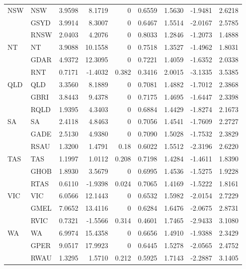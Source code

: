 \begin{table}[htbp]
{\begin{tabular}{llrrrrrrr}
    \multirow{3}[0]{*}{NSW} & NSW   & 3.9598 & 8.1719 & 0     & 0.6559 & 1.5630 & -1.9481 & 2.6218 \\
          & GSYD  & 3.9914 & 8.3007 & 0     & 0.6467 & 1.5514 & -2.0167 & 2.5785 \\
          & RNSW  & 2.0403 & 4.2076 & 0     & 0.8033 & 1.2846 & -1.2073 & 1.4888 \\
    \multirow{3}[0]{*}{NT} & NT    & 3.9088 & 10.1558 & 0     & 0.7518 & 1.3527 & -1.4962 & 1.8031 \\
          & GDAR  & 4.9372 & 12.3095 & 0     & 0.7221 & 1.4059 & -1.6352 & 2.0338 \\
          & RNT   & 0.7171 & -1.4032 & 0.382 & 0.3416 & 2.0015 & -3.1335 & 3.5385 \\
    \multirow{3}[0]{*}{QLD} & QLD   & 3.3560 & 8.1889 & 0     & 0.7081 & 1.4882 & -1.7012 & 2.3868 \\
          & GBRI  & 3.8443 & 9.4378 & 0     & 0.7175 & 1.4695 & -1.6447 & 2.3398 \\
          & RQLD  & 1.9395 & 4.3403 & 0     & 0.6884 & 1.4429 & -1.8274 & 2.1673 \\
    \multirow{3}[0]{*}{SA} & SA    & 2.4118 & 4.8463 & 0     & 0.7056 & 1.4541 & -1.7609 & 2.2727 \\
          & GADE  & 2.5130 & 4.9380 & 0     & 0.7090 & 1.5028 & -1.7532 & 2.3829 \\
          & RSAU  & 1.3200 & 1.4791 & 0.18  & 0.6022 & 1.5512 & -2.3196 & 2.6220 \\
    \multirow{3}[0]{*}{TAS} & TAS   & 1.1997 & 1.0112 & 0.208 & 0.7198 & 1.4284 & -1.4611 & 1.8390 \\
          & GHOB  & 1.8930 & 3.5679 & 0     & 0.6995 & 1.4536 & -1.5275 & 1.9228 \\
          & RTAS  & 0.6110 & -1.9398 & 0.024 & 0.7065 & 1.4169 & -1.5222 & 1.8161 \\
    \multirow{3}[0]{*}{VIC} & VIC   & 6.0566 & 12.1443 & 0     & 0.6532 & 1.5982 & -2.0154 & 2.7229 \\
          & GMEL  & 7.0652 & 13.4116 & 0     & 0.6284 & 1.6476 & -2.0675 & 2.8731 \\
          & RVIC  & 0.7321 & -1.5566 & 0.314 & 0.4601 & 1.7465 & -2.9433 & 3.1080 \\
    \multirow{3}[1]{*}{WA} & WA    & 6.9974 & 15.4358 & 0     & 0.6656 & 1.4910 & -1.9388 & 2.3429 \\
          & GPER  & 9.0517 & 17.9923 & 0     & 0.6445 & 1.5278 & -2.0565 & 2.4752 \\
          & RWAU  & 1.3295 & 1.5710 & 0.212 & 0.5925 & 1.7143 & -2.2887 & 3.1405 \\
   






  
    \bottomrule
    \end{tabular}%
  \label{tab:results_m_r}%
  
  }
\end{table}%
